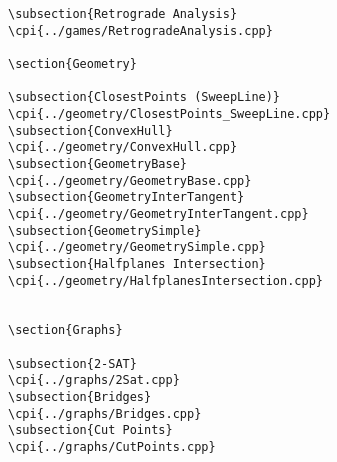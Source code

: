 {\begin{verbatim}
\subsection{Retrograde Analysis}
\cpi{../games/RetrogradeAnalysis.cpp}

\section{Geometry}

\subsection{ClosestPoints (SweepLine)}
\cpi{../geometry/ClosestPoints_SweepLine.cpp}
\subsection{ConvexHull}
\cpi{../geometry/ConvexHull.cpp}
\subsection{GeometryBase}
\cpi{../geometry/GeometryBase.cpp}
\subsection{GeometryInterTangent}
\cpi{../geometry/GeometryInterTangent.cpp}
\subsection{GeometrySimple}
\cpi{../geometry/GeometrySimple.cpp}
\subsection{Halfplanes Intersection}
\cpi{../geometry/HalfplanesIntersection.cpp}


\section{Graphs}

\subsection{2-SAT}
\cpi{../graphs/2Sat.cpp}
\subsection{Bridges}
\cpi{../graphs/Bridges.cpp}
\subsection{Cut Points}
\cpi{../graphs/CutPoints.cpp}

\end{verbatim}}
